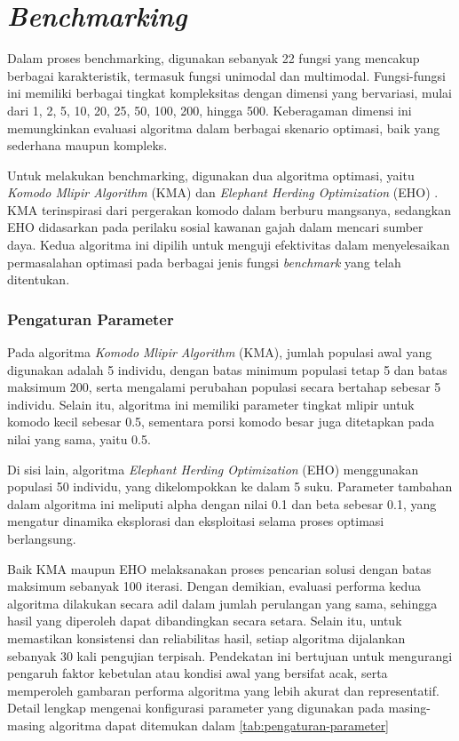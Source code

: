 

\section{\textit{Benchmarking}}
Dalam proses benchmarking, digunakan sebanyak 22 fungsi yang mencakup berbagai karakteristik, termasuk fungsi unimodal dan multimodal. Fungsi-fungsi ini memiliki berbagai tingkat kompleksitas dengan dimensi yang bervariasi, mulai dari 1, 2, 5, 10, 20, 25, 50, 100, 200, hingga 500. Keberagaman dimensi ini memungkinkan evaluasi algoritma dalam berbagai skenario optimasi, baik yang sederhana maupun kompleks.

Untuk melakukan benchmarking, digunakan dua algoritma optimasi, yaitu \textit{Komodo Mlipir Algorithm} (KMA) \citep{Suyanto_2022} dan \textit{Elephant Herding Optimization} (EHO) \citep{Wang_2015}. KMA terinspirasi dari pergerakan komodo dalam berburu mangsanya, sedangkan EHO didasarkan pada perilaku sosial kawanan gajah dalam mencari sumber daya. Kedua algoritma ini dipilih untuk menguji efektivitas dalam menyelesaikan permasalahan optimasi pada berbagai jenis fungsi \textit{benchmark} yang telah ditentukan.

\subsubsection{Pengaturan Parameter}
Pada algoritma \textit{Komodo Mlipir Algorithm} (KMA), jumlah populasi awal yang digunakan adalah 5 individu, dengan batas minimum populasi tetap 5 dan batas maksimum 200, serta mengalami perubahan populasi secara bertahap sebesar 5 individu. Selain itu, algoritma ini memiliki parameter tingkat mlipir untuk komodo kecil sebesar 0.5, sementara porsi komodo besar juga ditetapkan pada nilai yang sama, yaitu 0.5.

Di sisi lain, algoritma \textit{Elephant Herding Optimization} (EHO) menggunakan populasi 50 individu, yang dikelompokkan ke dalam 5 suku. Parameter tambahan dalam algoritma ini meliputi alpha dengan nilai 0.1 dan beta sebesar 0.1, yang mengatur dinamika eksplorasi dan eksploitasi selama proses optimasi berlangsung.

Baik KMA maupun EHO melaksanakan proses pencarian solusi dengan batas maksimum sebanyak 100 iterasi. Dengan demikian, evaluasi performa kedua algoritma dilakukan secara adil dalam jumlah perulangan yang sama, sehingga hasil yang diperoleh dapat dibandingkan secara setara. Selain itu, untuk memastikan konsistensi dan reliabilitas hasil, setiap algoritma dijalankan sebanyak 30 kali pengujian terpisah. Pendekatan ini bertujuan untuk mengurangi pengaruh faktor kebetulan atau kondisi awal yang bersifat acak, serta memperoleh gambaran performa algoritma yang lebih akurat dan representatif. Detail lengkap mengenai konfigurasi parameter yang digunakan pada masing-masing algoritma dapat ditemukan dalam \cref{tab:pengaturan-parameter}

